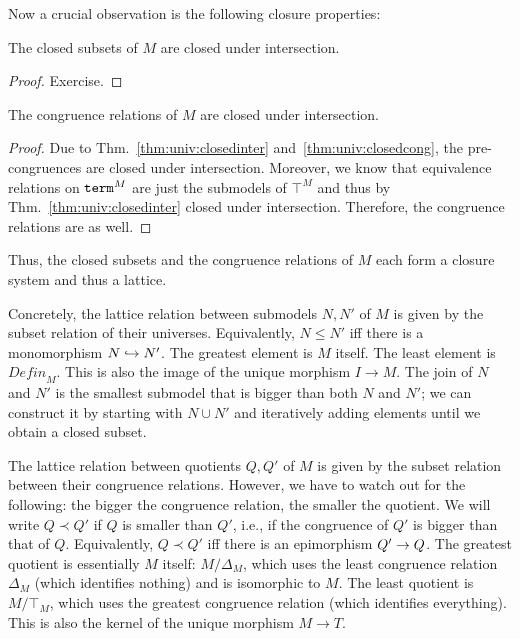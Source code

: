 Now a crucial observation is the following closure properties:

\begin{theorem}\label{thm:univ:closedinter}
The closed subsets of $M$ are closed under intersection.
\end{theorem}
\begin{proof}
Exercise.
\end{proof}

\begin{theorem}
The congruence relations of $M$ are closed under intersection.
\end{theorem}
\begin{proof}
Due to Thm.~\ref{thm:univ:closedinter} and~\ref{thm:univ:closedcong}, the pre-congruences are closed under intersection.
Moreover, we know that equivalence relations on $\mathtt{term}^M$ are just the submodels of $\top^M$ and thus by Thm.~\ref{thm:univ:closedinter} closed under intersection.
Therefore, the congruence relations are as well.
\end{proof}

Thus, the closed subsets and the congruence relations of $M$ each form a closure system and thus a lattice.

Concretely, the lattice relation between submodels $N,N'$ of $M$ is given by the subset relation of their universes.
Equivalently, $N\leq N'$ iff there is a monomorphism $N\hookrightarrow N'$.
The greatest element is $M$ itself.
The least element is $\mathit{Defin}_M$. This is also the image of the unique morphism $I\to M$.
The join of $N$ and $N'$ is the smallest submodel that is bigger than both $N$ and $N'$; we can construct it by starting with $N\cup N'$ and iteratively adding elements until we obtain a closed subset.

The lattice relation between quotients $Q,Q'$ of $M$ is given by the subset relation between their congruence relations.
However, we have to watch out for the following: the bigger the congruence relation, the smaller the quotient.
We will write $Q\prec Q'$ if $Q$ is smaller than $Q'$, i.e., if the congruence of $Q'$ is bigger than that of $Q$.
Equivalently, $Q\prec Q'$ iff there is an epimorphism $Q'\rightarrow Q$.
The greatest quotient is essentially $M$ itself: $M/\Delta_M$, which uses the least congruence relation $\Delta_M$ (which identifies nothing) and is isomorphic to $M$.
The least quotient is $M/\top_M$, which uses the greatest congruence relation (which identifies everything).
This is also the kernel of the unique morphism $M\to T$.

